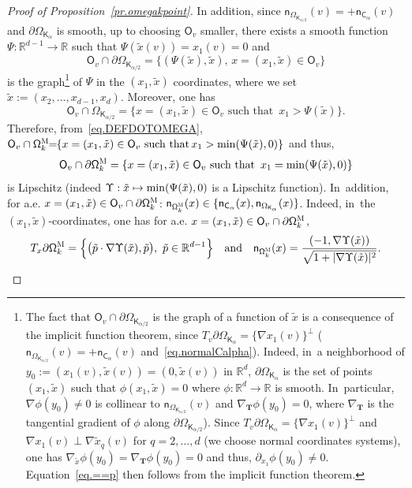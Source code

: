 \documentclass[10pt]{amsart}
\newcommand\mto{\mathchoice{\longmapsto}{\mapsto}{\mapsto}{\mapsto}}
\newcommand{\quand}{\quad\text{and}\quad}
\newcommand{\mbf}[1]{\mathbf{#1}}
\let\pa\partial
\theoremstyle{plain}
\theoremstyle{definition}
\begin{document}
\begin{proof}[Proof of Proposition~\ref{pr.omegakpoint}]
In addition, since $\mathsf n_{\Omega_{\mathsf K_{\alpha/2}}}(v)= +\mathsf n_{\mathsf C_\alpha}(v)$ and $\partial \Omega_{\mathsf K_\alpha}$ is smooth, up to choosing $\mathsf O_v$ smaller, there exists a smooth function $\Psi: \mathbb R^{d-1} \to \mathbb R$ such that $\Psi(\tilde x(v))=x_1(v)=0$ and
\begin{equation}\label{eq.==p}
\mathsf O_v\cap \partial \Omega_{\mathsf K_{\alpha/2}}=\{(\Psi(\tilde x), \tilde x), \, x=(x_1,\tilde x)\in \mathsf O_v\}
\end{equation}
is the graph\footnote{The
fact that $\mathsf O_v\cap \partial \Omega_{\mathsf
K_{\alpha/2}}$ is the graph of a function of $\tilde x$ is a
consequence of the implicit function theorem, since $T_v\partial \Omega_{\mathsf K_\alpha}= \{\nabla {x_1}(v)\}^\bot$ ($\mathsf n_{\Omega_{\mathsf K_{\alpha/2}}}(v)= +\mathsf n_{\mathsf C_\alpha}(v)$ and~\eqref{eq.normalCalpha}). Indeed, in~a neighborhood of $y_0:=(x_1(v), \tilde x(v))=(0,\tilde x(v))$ in $\mathbb R^d$, $\partial \Omega_{\mathsf K_\alpha}$ is the set of points $(x_1,\tilde x)$ such that $\phi(x_1,\tilde x)=0$ where $\phi:\mathbb R^d\to \mathbb R$ is smooth. In~particular, $\nabla \phi(y_0)\neq 0$ is collinear to $\mathsf n_{\Omega_{\mathsf K_{\alpha/2}}}(v)$ and $\nabla_{\mbf T}\phi(y_0)=0$, where $\nabla_{\mbf T}$ is the tangential gradient of $\phi$ along $\partial \Omega_{\mathsf K_{\alpha/2}}$). Since $T_v\partial \Omega_{\mathsf K_\alpha}= \{\nabla {x_1}(v)\}^\bot$ and $\nabla {x_1}(v)\perp \nabla {\tilde x_q}(v)$ for $q=2,\ldots,d$ (we choose normal coordinates systems), one has $\nabla_{\tilde x}\phi(y_0)=\nabla_{\mbf T}\phi(y_0)=0$ and thus, $\partial_{x_1}\phi(y_0)\neq 0$. Equation~\eqref{eq.==p} then follows from the implicit function theorem.} of $\Psi$ in the $(x_1,\tilde x)$ coordinates, where
we set $\tilde x:=(x_2,\ldots, x_{d-1},x_d)$.
Moreover, one has
\[
\mathsf O_v\cap \Omega_{\mathsf K_{\alpha/2}}=\{x=(x_1,\tilde x)\in \mathsf O_v \text{ such that } \, x_1>\Psi(\tilde x)\}.
\]
Therefore, from~\eqref{eq.DEFDOTOMEGA},
$ \mathsf O_v\cap \mathsf \Omega_k^{\textsc{M}}\!\! =\!\! \{x=(x_1,\tilde x)\in \mathsf O_v \text{ such that} \, x_1>\min(\Psi(\tilde x),0)\}
$ and thus,
\[
\mathsf O_v\cap \pa \mathsf \Omega_k^{\textsc{M}} =\{x=(x_1,\tilde x)\in \mathsf O_v \text{ such that } \, x_1=\min(\Psi(\tilde x),0)\}
\]
is Lipschitz (indeed $\Upsilon: \tilde x\mto \min(\Psi(\tilde x),0)$ is a Lipschitz function). In~addition, for a.e. $x=(x_1,\tilde x)\in \mathsf O_v\cap \pa \mathsf \Omega_k^{\textsc{M}}$: $\mathsf n_{\mathsf \Omega_k^{\textsc{M}}}(x)\in \{ \mathsf n_{ \mathsf C_\alpha }(x), \mathsf n_{ \Omega_{\mathsf K_\alpha} }(x)\}$. Indeed, in~the $(x_1,\tilde x)$-coordinates, one has for a.e. $x=(x_1,\tilde x)\in \mathsf O_v\cap \pa \mathsf \Omega_k^{\textsc{M}}$,
\[
T_x \pa \mathsf \Omega_k^{\textsc{M}}=\Big\{\bigl(\tilde p\cdot \nabla \Upsilon (\tilde x), \tilde p\bigr), \ \tilde p \in \mathbb R^{d-1}\Big\} \quand \mathsf n_{\mathsf \Omega_k^{\textsc{M}}}(x)=\frac{(-1, \nabla \Upsilon (\tilde x))}{\sqrt{1+ \vert \nabla\Upsilon (\tilde x)\vert^2 }}.
\]


\end{proof}
\end{document}
